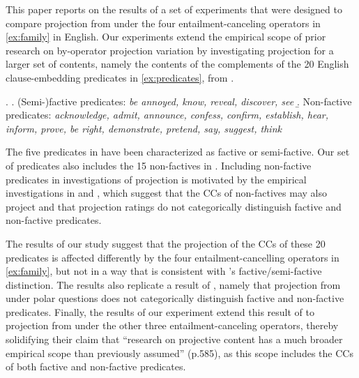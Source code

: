 \documentclass[a4paper,12pt,twoside]{article}
\newcommand{\poscite}[1]{\citeauthor{#1}'s \citeyear{#1}}
\begin{document}
    This paper reports on the results of a set of experiments that were designed to compare projection from under the four entailment-canceling operators in \ref{ex:family} in English. Our experiments extend the empirical scope of prior research on by-operator projection variation by investigating projection for a larger set of contents, namely the contents of the complements of the 20 English clause-embedding predicates in \ref{ex:predicates}, from \citet{degen_are_2022}.
    
    \ex. \label{ex:predicates}
    		\a. (Semi-)factive predicates: {\em be annoyed, know, reveal, discover, see}
      \b. Non-factive predicates: {\em acknowledge, admit, announce, confess, confirm, establish, hear, inform, prove, be right, demonstrate, pretend, say, suggest, think}
    
    The five predicates in \Last[a] have been characterized as factive or semi-factive. Our set of predicates also includes the 15 non-factives in \Last[b]. Including non-factive predicates in investigations of projection is motivated by the empirical investigations in \citealt{de_marneffe_commitmentbank_2019} and \citealt{degen_are_2022}, which suggest that the CCs of non-factives may also project and that projection ratings do not categorically distinguish factive and non-factive predicates.
  
    The results of our study suggest that the projection of the CCs of these 20 predicates is affected differently by the four entailment-cancelling operators in \ref{ex:family},  but not in a way that is consistent with \poscite{karttunen_observations_1971} factive/semi-factive distinction. The results also replicate a result of \citealt{degen_are_2022}, namely that projection from under polar questions does not categorically distinguish factive and non-factive predicates. Finally, the results of our experiment extend this result of \citealt{degen_are_2022} to projection from under the other three entailment-canceling operators, thereby solidifying their claim that ``research on projective content has a much broader empirical scope than previously assumed'' (p.585), as this scope includes the CCs of both factive and non-factive predicates.
\end{document}
